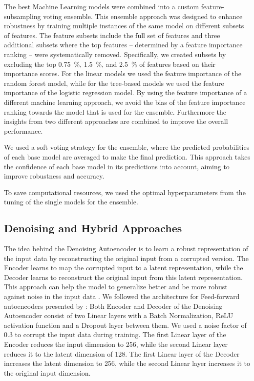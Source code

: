 \documentclass[11pt]{article}
\begin{document}
The best Machine Learning models were combined into a custom feature-subsampling voting ensemble. This ensemble approach was designed to enhance robustness by training multiple instances of the same model on different subsets of features. The feature subsets include the full set of features and three additional subsets where the top features -- determined by a feature importance ranking -- were systematically removed. Specifically, we created subsets by excluding the top 0.75~\%, 1.5~\%, and 2.5~\% of features based on their importance scores.
For the linear models we used the feature importance of the random forest model, while for the tree-based models we used the feature importance of the logistic regression model. 
By using the feature importance of a different machine learning approach, we avoid the bias of the feature importance ranking towards the model that is used for the ensemble. Furthermore the insights from two different approaches are combined to improve the overall performance.

We used a soft voting strategy for the ensemble, where the predicted probabilities of each base model are averaged to make the final prediction. This approach takes the confidence of each base model in its predictions into account, aiming to improve robustness and accuracy.

To save computational resources, we used the optimal hyperparameters from the tuning of the single models for the ensemble.


\subsection{Denoising and Hybrid Approaches}\label{sec:methods:denoising-hybrid}

The idea behind the Denoising Autoencoder is to learn a robust representation of the input data by reconstructing the original input from a corrupted version. The Encoder learns to map the corrupted input to a latent representation, while the Decoder learns to reconstruct the original input from this latent representation. This approach can help the model to generalize better and be more robust against noise in the input data \cite{lin_scdilt_2025}.
We followed the architecture for Feed-forward autoencoders presented by \textcite{hayashi_conformer-based_2020}: Both Encoder and Decoder of the Denoising Autoencoder consist of two Linear layers with a Batch Normalization, ReLU activation function and a Dropout layer between them.
We used a noise factor of 0.3 to corrupt the input data during training. The first Linear layer of the Encoder reduces the input dimension to 256, while the second Linear layer reduces it to the latent dimension of 128. The first Linear layer of the Decoder increases the latent dimension to 256, while the second Linear layer increases it to the original input dimension.
\end{document}
